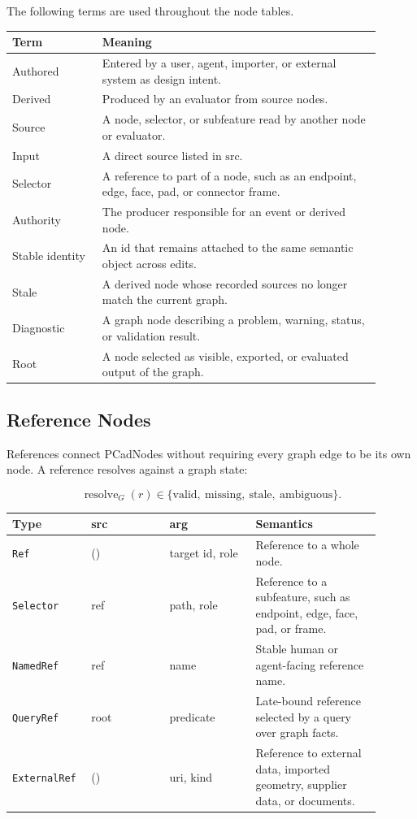 \documentclass[11pt]{article}
\newcommand{\Type}[1]{\texttt{#1}}
\newcommand{\Field}[1]{\ensuremath{\mathrm{#1}}}
\begin{document}
The following terms are used throughout the node tables.

\begin{center}
\small
\begin{tabular}{@{}p{0.22\linewidth}p{0.68\linewidth}@{}}
\hline
\textbf{Term} & \textbf{Meaning} \\
\hline
Authored & Entered by a user, agent, importer, or external system as design intent. \\
Derived & Produced by an evaluator from source nodes. \\
Source & A node, selector, or subfeature read by another node or evaluator. \\
Input & A direct source listed in \Field{src}. \\
Selector & A reference to part of a node, such as an endpoint, edge, face, pad, or connector frame. \\
Authority & The producer responsible for an event or derived node. \\
Stable identity & An id that remains attached to the same semantic object across edits. \\
Stale & A derived node whose recorded sources no longer match the current graph. \\
Diagnostic & A graph node describing a problem, warning, status, or validation result. \\
Root & A node selected as visible, exported, or evaluated output of the graph. \\
\hline
\end{tabular}
\end{center}

\subsection{Reference Nodes}

References connect PCadNodes without requiring every graph edge to be its own node. A reference resolves against a graph state:

\[
\operatorname{resolve}_G(r) \in \{\text{valid},\ \text{missing},\ \text{stale},\ \text{ambiguous}\}.
\]

\begin{center}
\small
\begin{tabular}{@{}p{0.16\linewidth}p{0.20\linewidth}p{0.22\linewidth}p{0.32\linewidth}@{}}
\hline
\textbf{Type} & \textbf{src} & \textbf{arg} & \textbf{Semantics} \\
\hline
\Type{Ref} & () & target id, role & Reference to a whole node. \\
\Type{Selector} & ref & path, role & Reference to a subfeature, such as endpoint, edge, face, pad, or frame. \\
\Type{NamedRef} & ref & name & Stable human or agent-facing reference name. \\
\Type{QueryRef} & root & predicate & Late-bound reference selected by a query over graph facts. \\
\Type{ExternalRef} & () & uri, kind & Reference to external data, imported geometry, supplier data, or documents. \\
\hline
\end{tabular}
\end{center}
\end{document}
